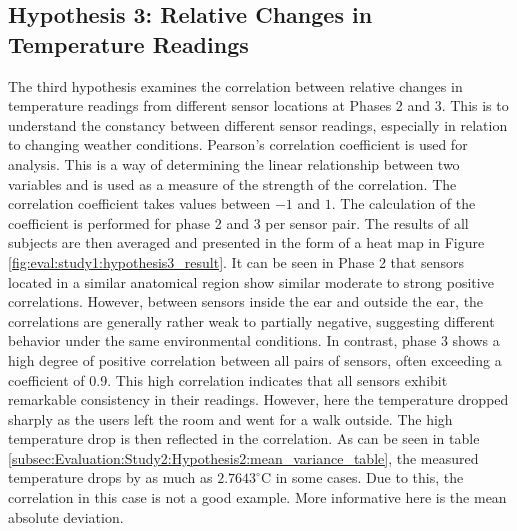 \subsection{Hypothesis 3: Relative Changes in Temperature Readings}
\label{subsec:Evaluation:Study1:Hypothesis3}
The third hypothesis examines the correlation between relative changes in temperature readings from different sensor locations at Phases 2 and 3.
This is to understand the constancy between different sensor readings, especially in relation to changing weather conditions.
Pearson's correlation coefficient is used for analysis.
This is a way of determining the linear relationship between two variables and is used as a measure of the strength of the correlation. 
The correlation coefficient takes values between $-1$ and $1$. 
The calculation of the coefficient is performed for phase 2 and 3 per sensor pair. 
The results of all subjects are then averaged and presented in the form of a heat map in Figure \ref{fig:eval:study1:hypothesis3_result}.
It can be seen in Phase 2 that sensors located in a similar anatomical region show similar moderate to strong positive correlations. 
However, between sensors inside the ear and outside the ear, the correlations are generally rather weak to partially negative, suggesting different behavior under the same environmental conditions.
In contrast, phase 3 shows a high degree of positive correlation between all pairs of sensors, often exceeding a coefficient of 0.9.
This high correlation indicates that all sensors exhibit remarkable consistency in their readings. 
However, here the temperature dropped sharply as the users left the room and went for a walk outside. 
The high temperature drop is then reflected in the correlation.
As can be seen in table \ref{subsec:Evaluation:Study2:Hypothesis2:mean_variance_table}, the measured temperature drops by as much as $2.7643^\circ\text{C}$ in some cases.
Due to this, the correlation in this case is not a good example.
More informative here is the mean absolute deviation.

